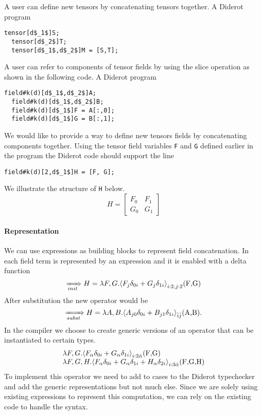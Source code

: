 
A user can define new tensors by concatenating tensors together.
A Diderot program
\begin{lstlisting}[mathescape=true]
  tensor[d$_1$]S; 
  tensor[d$_2$]T;
  tensor[d$_1$,d$_2$]M = [S,T]; 
\end{lstlisting}

A user can refer to components of tensor fields by using the slice operation as shown in the following code.
A Diderot program
\begin{lstlisting}[mathescape=true]
  field#k(d)[d$_1$,d$_2$]A; 
  field#k(d)[d$_1$,d$_2$]B;
  field#k(d)[d$_1$]F = A[:,0]; 
  field#k(d)[d$_1$]G = B[:,1];
\end{lstlisting}

We would like to provide a way to define new tensors fields by concatenating components together.
Using the tensor field variables \lstinline!F! and  \lstinline!G! defined earlier in the program the Diderot code should support the line 
\begin{lstlisting}[mathescape=true]
  field#k(d)[2,d$_1$]H = [F, G];
\end{lstlisting}

\noindent We illustrate the structure of \lstinline[mathescape=true]!H! below.  
\begin{displaymath}
  H=\left[ \begin{array}{ll}
  F_0  & F_1\\
  G_0  &G_1
  \end{array}
 \right]  
 \end{displaymath}
 
\paragraph{Representation}
We can use \name{} expressions as building blocks to represent field concatenation. 
In \name{} each field term is represented by an  expression and it is enabled with a delta function 
$$\rewriteInitA{} H=\lambda F,G.\EinExp{F_{j }\delta_{0i}+G_{j }\delta_{1i}}{i:2,j:2}\text{(\lstinline[mathescape=true]!F,G!)}$$
After substitution the new \name{} operator would be 
$$\rewriteSubst{}H=\lambda A,B.\EinExp{A_{j 0}\delta_{0i}+B_{j 1}\delta_{1i}}{\hat{i}\hat{j}}\text{(\lstinline[mathescape=true]!A,B!)}.$$
In the compiler we choose to create generic versions of an \name{} operator that can be instantiated to certain types.
$$\begin{array}{l}
\lambda F,G. \EinExp{F_{\alpha }\delta_{0i}+G_{\alpha }\delta_{1i}}{{i:2} \hat{\alpha} }\text{(\lstinline[mathescape=true]!F,G!)}\\
\lambda F,G, H.\EinExp{F_{\alpha }\delta_{0i}+G_{\alpha }\delta_{1i}+H_{\alpha }\delta_{2i}}{{i:3} \hat{\alpha} }\text{(\lstinline[mathescape=true]!F,G,H!)}
\end{array}$$
To implement this operator we  need to add to cases to the Diderot typechecker and add the generic representations but not much else.
Since we are solely using existing \name{} expressions to represent this computation, we can rely on the existing code to handle the \name{} syntax.


